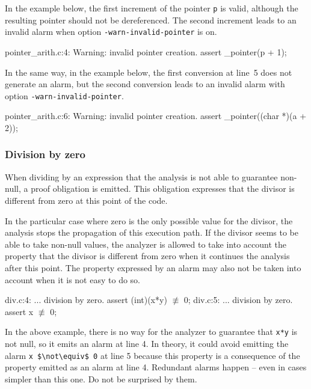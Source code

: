 \documentclass{frama-c-book}
\begin{document}
In the example below, the first increment of the pointer \lstinline|p| is valid,
although the resulting pointer should not be dereferenced. The second increment
leads to an invalid alarm when option \lstinline|-warn-invalid-pointer| is on.
\begin{logsmath}
   pointer_arith.c:4: Warning:
    invalid pointer creation. assert \object_pointer(p + 1);
\end{logsmath}

In the same way, in the example below, the first conversion at line~5
does not generate an alarm, but the second conversion leads to an invalid alarm
with option \lstinline|-warn-invalid-pointer|.

\begin{logsmath}
   pointer_arith.c:6: Warning:
    invalid pointer creation. assert \object_pointer((char *)(a + 2));
\end{logsmath}


\subsubsection{Division by zero}
When dividing by an expression that the analysis
is not able to guarantee non-null, a proof
obligation is emitted. This obligation expresses that the divisor
is different from zero at this point of the code.

In the particular case where zero is the only possible value
for the divisor, the analysis stops the propagation of this
execution path.
If the divisor seems to be able to take non-null values,
the analyzer
is allowed to take into account the
property that the divisor is different from zero when it continues
the analysis after this point.
The property expressed by an alarm may also not be taken into account
when it is not easy to do so.
\begin{logsmath}
div.c:4: ... division by zero. assert (int)(x*y) $\not\equiv$ 0;
div.c:5: ... division by zero. assert x $\not\equiv$ 0;
\end{logsmath}
In the above example, there is no way for the analyzer
to guarantee that \lstinline|x*y| is not null, so it emits
an alarm at line 4. In theory, it could avoid emitting
the alarm \lstinline|x $\not\equiv$ 0| at line 5
because this property is a consequence of the property emitted
as an alarm at line 4. Redundant alarms happen -- even in cases
simpler than this one. Do not be surprised by them.
\end{document}
